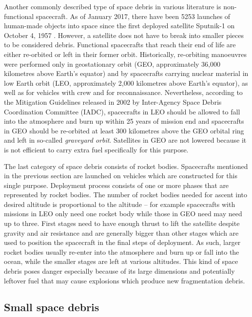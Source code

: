 	Another commonly described type of space debris in various literature is non-functional spacecraft. As of January 2017, there have been 5253 launches of human-made objects into space since the first deployed satellite Sputnik-1 on October 4, 1957 \citep{esabr336}. However, a satellite does not have to break into smaller pieces to be considered debris. Functional spacecrafts that reach their end of life are either re-orbited or left in their former orbit. Historically, re-orbiting manoeuvres were performed only in geostationary orbit (GEO, approximately 36,000 kilometres above Earth's equator) and by spacecrafts carrying nuclear material in low Earth orbit (LEO, approximately 2,000 kilometres above Earth's equator), as well as for vehicles with crew and for reconnaissance. Nevertheless, according to the Mitigation Guidelines released in 2002 by Inter-Agency Space Debris Coordination Committee (IADC), spacecrafts in LEO should be allowed to fall into the atmosphere and burn up within 25 years of mission end and spacecrafts in GEO should be re-orbited at least 300 kilometres above the GEO orbital ring and left in so-called \emph{graveyard orbit}. Satellites in GEO are not lowered because it is not efficient to carry extra fuel specifically for this purpose.
	
	The last category of space debris consists of rocket bodies. Spacecrafts mentioned in the previous section are launched on vehicles which are constructed for this single purpose. Deployment process consists of one or more phases that are represented by rocket bodies. The number of rocket bodies needed for ascent into desired altitude is proportional to the altitude – for example spacecrafts with missions in LEO only need one rocket body while those in GEO need may need up to three. First stages need to have enough thrust to lift the satellite despite gravity and air resistance and are generally bigger than other stages which are used to position the spacecraft in the final steps of deployment. As such, larger rocket bodies usually re-enter into the atmosphere and burn up or fall into the ocean, while the smaller stages are left at various altitudes. This kind of space debris poses danger especially because of its large dimensions and potentially leftover fuel that may cause explosions which produce new fragmentation debris.
	
\subsection{Small space debris}\label{subsec:small_space_debris}

